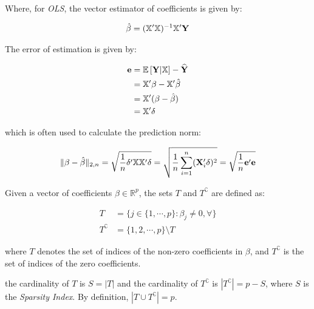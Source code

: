 Where, for \emph{OLS}, the vector estimator of coefficients is given by:

\begin{align*}
\hat{\beta} = (\mathbb{X}'\mathbb{X})^{-1}\mathbb{X}'\mathbf{Y}
\end{align*}

The error of estimation is given by:

\begin{align*}
\mathbf{e} &= \mathbb{E}\left[\mathbf{Y}|\mathbb{X}\right] - \widehat{\mathbf{Y}}\\
&= \mathbb{X}'\beta - \mathbb{X}'\hat{\beta}\\
&= \mathbb{X}'(\beta - \hat{\beta}) \\
&= \mathbb{X}'\delta
\end{align*}

which is often used to calculate the prediction norm:

\begin{align*}
\|\beta - \hat{\beta}\|_{2,n} 
    = \sqrt{\frac{1}{n} \delta'\mathbb{X}\mathbb{X}'\delta} 
    = \sqrt{\frac{1}{n} \sum_{i=1}^{n} (\mathbf{X}_i'\delta)^2}
    = \sqrt{\frac{1}{n} \mathbf{e}'\mathbf{e}}
\end{align*}

\begin{Def}
Given a vector of  coefficients $\beta \in \mathbb{R}^p$, the sets $T$ and $T^{\complement}$ are defined as:

\begin{align*}
T &= \lbrace
j \in \{1, \cdots, p \} : \beta_j \neq 0, \forall 
\rbrace  \\
T^{\complement} &= \{1, 2, \cdots, p\} \setminus T
\end{align*}

where $T$ denotes the set of indices of the non-zero coefficients in $\beta$, and $T^{\complement}$ is the set of indices of the zero coefficients.

the cardinality of $T$ is $S = |T|$ and the cardinality of $T^{\complement}$ is $|T^{\complement}| = p - S$, where $S$ is the \emph{Sparsity Index}. By definition, $|T \cup T^{\complement}| = p$.
\end{Def}

